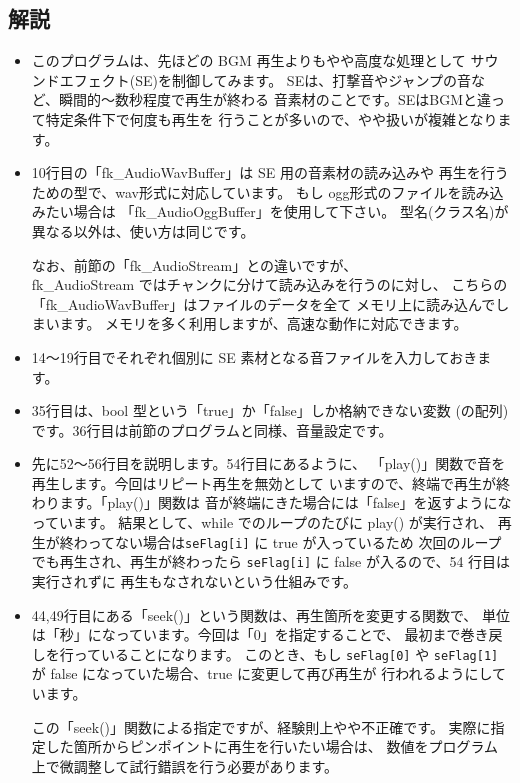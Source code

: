 \subsection*{解説}
\begin{itemize}
 \item このプログラムは、先ほどの BGM 再生よりもやや高度な処理として
	サウンドエフェクト(SE)を制御してみます。
	SEは、打撃音やジャンプの音など、瞬間的〜数秒程度で再生が終わる
	音素材のことです。SEはBGMと違って特定条件下で何度も再生を
	行うことが多いので、やや扱いが複雑となります。

 \item 10行目の「fk\_AudioWavBuffer」は SE 用の音素材の読み込みや
	再生を行うための型で、wav形式に対応しています。
	もし ogg形式のファイルを読み込みたい場合は
	「fk\_AudioOggBuffer」を使用して下さい。
	型名(クラス名)が異なる以外は、使い方は同じです。

	なお、前節の「fk\_AudioStream」との違いですが、\\
	fk\_AudioStream ではチャンクに分けて読み込みを行うのに対し、
	こちらの「fk\_AudioWavBuffer」はファイルのデータを全て
	メモリ上に読み込んでしまいます。
	メモリを多く利用しますが、高速な動作に対応できます。

 \item 14〜19行目でそれぞれ個別に SE 素材となる音ファイルを入力しておきます。

 \item 35行目は、bool 型という「true」か「false」しか格納できない変数
	(の配列)です。36行目は前節のプログラムと同様、音量設定です。

 \item 先に52〜56行目を説明します。54行目にあるように、
	「play()」関数で音を再生します。今回はリピート再生を無効として
	いますので、終端で再生が終わります。「play()」関数は
	音が終端にきた場合には「false」を返すようになっています。
	結果として、while でのループのたびに play() が実行され、
	再生が終わってない場合は\verb+seFlag[i]+ に true が入っているため
	次回のループでも再生され、再生が終わったら
	\verb+seFlag[i]+ に false が入るので、54 行目は実行されずに
	再生もなされないという仕組みです。

 \item 44,49行目にある「seek()」という関数は、再生箇所を変更する関数で、
	単位は「秒」になっています。今回は「0」を指定することで、
	最初まで巻き戻しを行っていることになります。
	このとき、もし \verb+seFlag[0]+ や \verb+seFlag[1]+ が
	false になっていた場合、true に変更して再び再生が
	行われるようにしています。

	この「seek()」関数による指定ですが、経験則上やや不正確です。
	実際に指定した箇所からピンポイントに再生を行いたい場合は、
	数値をプログラム上で微調整して試行錯誤を行う必要があります。

\end{itemize}

